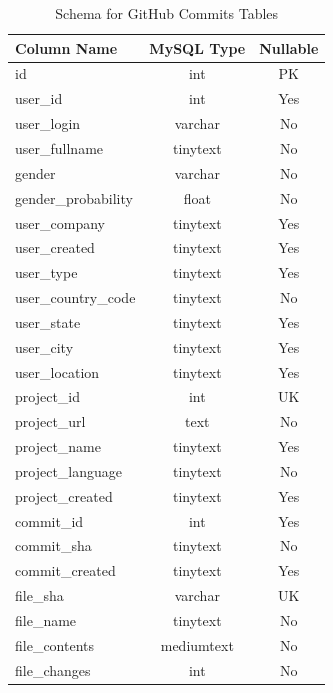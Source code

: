 \documentclass{article}
\begin{document}
\begin{table}[t!]
    \begin{center}
        \caption{Schema for GitHub Commits Tables}
        \label{tab:git_commit_schema}
        \begin{tabular}{|l | c | c |}
            \hline
            \textbf{Column Name} & \textbf{MySQL Type} & \textbf{Nullable}\\
            \hline
            id & int & PK\\
            user{\_}id & int & Yes\\
            user{\_}login & varchar & No\\
            user{\_}fullname & tinytext & No\\
            gender & varchar & No\\
            gender{\_}probability & float & No\\
            user{\_}company  & tinytext & Yes\\
            user{\_}created & tinytext & Yes\\
            user{\_}type & tinytext & Yes\\
            user{\_}country{\_}code & tinytext & No\\
            user{\_}state & tinytext & Yes\\
            user{\_}city & tinytext & Yes\\
            user{\_}location & tinytext & Yes\\
            \hline
            project{\_}id & int & UK\\
            project{\_}url & text & No\\
            project{\_}name & tinytext & Yes\\
            project{\_}language & tinytext & No\\
            project{\_}created & tinytext & Yes\\
            \hline
            commit{\_}id & int & Yes\\
            commit{\_}sha & tinytext & No\\
            commit{\_}created & tinytext & Yes\\
            \hline
            file{\_}sha & varchar & UK\\
            file{\_}name & tinytext & No\\
            file{\_}contents & mediumtext & No\\
            file{\_}changes & int & No\\
            \hline
        \end{tabular}
    \end{center}
\end{table}
\end{document}
